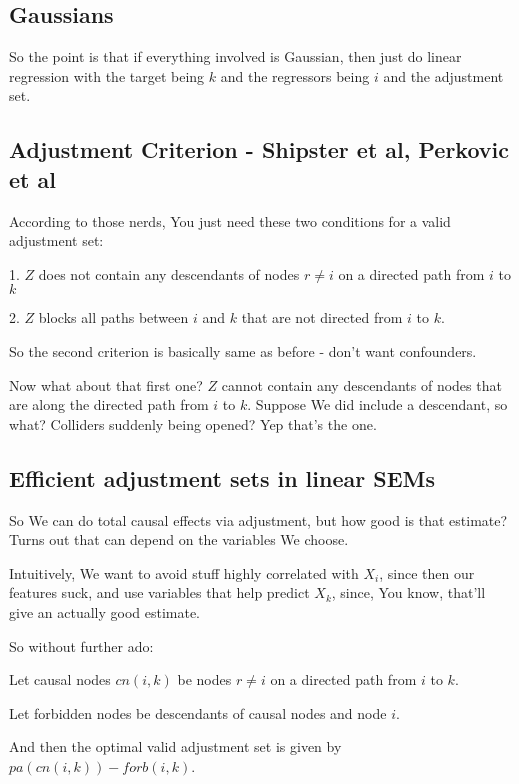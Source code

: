 \documentclass{article}
\begin{document}
	\subsection{Gaussians}
	
		So the point is that if everything involved is Gaussian, then just do linear regression with the target being $k$ and the regressors being $i$ and the adjustment set.
		
	\subsection{Adjustment Criterion - Shipster et al, Perkovic et al}
		 
	According to those nerds, You just need these two conditions for a valid adjustment set:
	
	1. $Z$ does not contain any descendants of nodes $r\neq i$ on a directed path from $i$ to $k$
	
	2. $Z$ blocks all paths between $i$ and $k$ that are not directed from $i$ to $k$.
	
	So the second criterion is basically same as before - don't want confounders.
	
	Now what about that first one? $Z$ cannot contain any descendants of nodes that are along the directed path from $i$ to $k$. Suppose We did include a descendant, so what? Colliders suddenly being opened? Yep that's the one. 
		 
	\subsection{Efficient adjustment sets in linear SEMs}
	
		So We can do total causal effects via adjustment, but how good is that estimate? Turns out that can depend on the variables We choose.
		
		Intuitively, We want to avoid stuff highly correlated with $X_i$, since then our features suck, and use variables that help predict $X_k$, since, You know, that'll give an actually good estimate.
		
		So without further ado:
		
		Let causal nodes $cn(i, k)$ be nodes $r\neq i$ on a directed path from $i$ to $k$.
		
		Let forbidden nodes be descendants of causal nodes and node $i$.
		
		And then the optimal valid adjustment set is given by $pa(cn(i, k))- forb(i, k)$.
		
\end{document}
